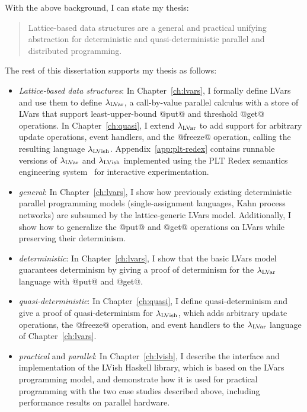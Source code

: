 With the above background, I can state my thesis:
\begin{quote}
  Lattice-based data structures are a general and practical unifying
  abstraction for deterministic and quasi-deterministic parallel and
  distributed programming.
\end{quote}
  The rest of this
dissertation supports my thesis as follows:
\begin{itemize}
  \item \emph{Lattice-based data structures}: In
    Chapter~\ref{ch:lvars}, I formally define LVars and use them to
    define $\lambda_{\textrm{LVar}}$, a call-by-value parallel calculus with a
    store of LVars that support least-upper-bound @put@ and threshold
    @get@ operations. In Chapter~\ref{ch:quasi}, I extend
    $\lambda_{\textrm{LVar}}$ to add support for arbitrary update operations,
    event handlers, and the @freeze@ operation, calling the resulting
    language $\lambda_{\textrm{LVish}}$.  Appendix~\ref{app:plt-redex} contains
    runnable versions of $\lambda_{\textrm{LVar}}$ and $\lambda_{\textrm{LVish}}$ implemented
    using the PLT Redex semantics engineering system~\cite{redex-book}
    for interactive experimentation.

  \item \emph{general}: In Chapter~\ref{ch:lvars}, I show how
    previously existing deterministic parallel programming models
    (single-assignment languages, Kahn process networks) are subsumed
    by the lattice-generic LVars model.  Additionally, I show how to
    generalize the @put@ and @get@ operations on LVars while
    preserving their determinism.

  \item \emph{deterministic}: In Chapter~\ref{ch:lvars}, I show that
    the basic LVars model guarantees determinism by giving a proof of
    determinism for the $\lambda_{\textrm{LVar}}$ language with @put@ and @get@.

  \item \emph{quasi-deterministic}: In Chapter~\ref{ch:quasi}, I
    define quasi-determinism and give a proof of quasi-determinism for
    $\lambda_{\textrm{LVish}}$, which adds arbitrary update operations, the
    @freeze@ operation, and event handlers to the $\lambda_{\textrm{LVar}}$
    language of Chapter~\ref{ch:lvars}.

  \item \emph{practical} and \emph{parallel}: In
    Chapter~\ref{ch:lvish}, I describe the interface and
    implementation of the LVish Haskell library, which is based on the
    LVars programming model, and demonstrate how it is used for
    practical programming with the two case studies described above,
    including performance results on parallel hardware.


\end{itemize}
